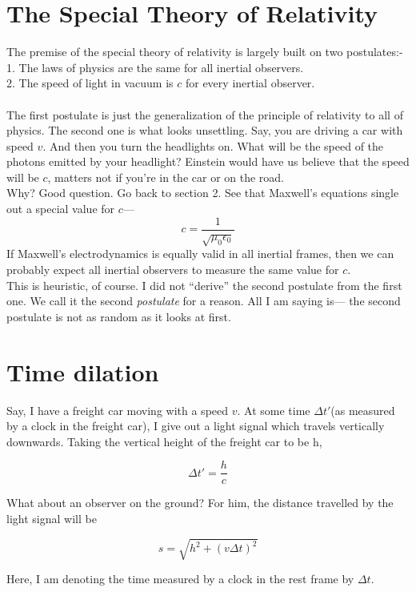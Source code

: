 \documentclass[12pt]{article}
\begin{document}
\section{The Special Theory of Relativity}
The premise of the special theory of relativity is largely built on two postulates:-\\

   1. The laws of physics are the same for all inertial observers.\\
   2. The speed of light in vacuum is $c$ for every inertial observer. \\\\
The first postulate is just the generalization of the principle of relativity to all of physics. The second one 
is what looks unsettling. Say, you are driving a car with speed $v$. And then you turn the headlights on. What will be the speed of the photons 
emitted by your headlight? Einstein would have us believe that the speed will be $c$, matters not if you're in the car or on the road. \\
Why? Good question. Go back to section 2. See that Maxwell's equations single out a special value for $c$--- 
\[c = \frac{1}{\sqrt{\mu_0\epsilon_0}}\]
If Maxwell's electrodynamics is equally valid in all inertial frames, then we can probably expect all inertial observers
to measure the same value for $c$.\\
This is heuristic, of course. I did not ``derive'' the 
second postulate from the first one. We call it the second \textit{postulate} for a reason. All I am saying is--- the second postulate is not as random as it looks at first.    


\section{Time dilation}

Say, I have a freight car moving with a speed $v$. At some time $\Delta t'$(as measured by a clock in the freight car), I give out a light signal which 
travels vertically downwards. Taking the vertical height of the freight car to be h, 

\[\Delta t' = \frac{h}{c}\]

What about an observer on the ground? For him, the distance travelled by the light signal will be 

\[s = \sqrt{h^2 + (v\Delta t)^2}\]

Here, I am denoting the time measured by a clock in the rest frame by $\Delta t$. 
\end{document}
